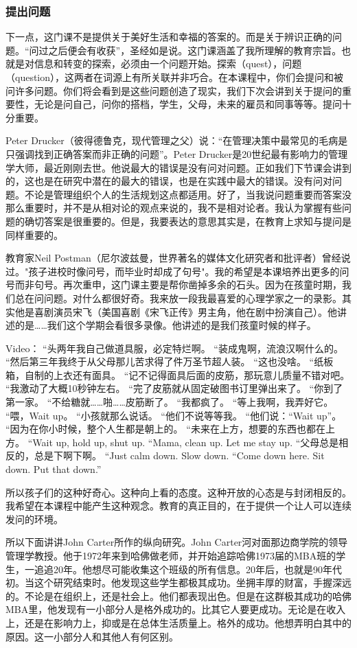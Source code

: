 \subsubsection{提出问题}
下一点，这门课不是提供关于美好生活和幸福的答案的。而是关于辨识正确的问题。“问过之后便会有收获”，圣经如是说。这门课涵盖了我所理解的教育宗旨。也就是对信息和转变的探索，必须由一个问题开始。探索（quest），问题（question），这两者在词源上有所关联并非巧合。在本课程中，你们会提问和被问许多问题。你们将会看到是这些问题创造了现实，我们下次会讲到关于提问的重要性，无论是问自己，问你的搭档，学生，父母，未来的雇员和同事等等。提问十分重要。

Peter Drucker（彼得德鲁克，现代管理之父）说：“在管理决策中最常见的毛病是只强调找到正确答案而非正确的问题”。Peter Drucker是20世纪最有影响力的管理学大师，最近刚刚去世。他说最大的错误是没有问对问题。正如我们下节课会讲到的，这也是在研究中潜在的最大的错误，也是在实践中最大的错误。没有问对问题。不论是管理组织个人的生活规划这点都适用。好了，当我说问题重要而答案没那么重要时，并不是从相对论的观点来说的，我不是相对论者。我认为掌握有些问题的确切答案是很重要的。但是，我要表达的意思其实是，在教育上求知与提问是同样重要的。

教育家Neil Postman（尼尔波兹曼，世界著名的媒体文化研究者和批评者）曾经说过。"孩子进校时像问号，而毕业时却成了句号"。我的希望是本课培养出更多的问号而非句号。再次重申，这门课主要是帮你凿掉多余的石头。因为在孩童时期，我们总在问问题。对什么都很好奇。我来放一段我最喜爱的心理学家之一的录影。其实他是喜剧演员宋飞（美国喜剧《宋飞正传》男主角，他在剧中扮演自己）。他讲述的是……我们这个学期会看很多录像。他讲述的是我们孩童时候的样子。

Video：
“头两年我自己做道具服，必定特烂啊。
“装成鬼啊，流浪汉啊什么的。
“然后第三年我终于从父母那儿苦求得了件万圣节超人装。
“这也没啥。
“纸板箱，自制的上衣还有面具。
“记不记得面具后面的皮筋，那玩意儿质量不错对吧。
“我激动了大概10秒钟左右。
“完了皮筋就从固定破图书订里弹出来了。
“你到了第一家。
“不给糖就……啪……皮筋断了。
“我都疯了。
“等上我啊，我弄好它。
“喂，Wait up。
“小孩就那么说话。
“他们不说等等我。
“他们说：“Wait up”。
“因为在你小时候，整个人生都是朝上的。
“未来在上方，想要的东西也都在上方。
“Wait up, hold up, shut up.
“Mama, clean up. Let me stay up.
“父母总是相反的，总是下啊下啊。
“Just calm down. Slow down.
“Come down here. Sit down. Put that down.”

所以孩子们的这种好奇心。这种向上看的态度。这种开放的心态是与封闭相反的。我希望在本课程中能产生这种观念。教育的真正目的，在于提供一个让人可以连续发问的环境。

所以下面讲讲John Carter所作的纵向研究。John Carter河对面那边商学院的领导管理学教授。他于1972年来到哈佛做老师，并开始追踪哈佛1973届的MBA班的学生，一追追20年。他想尽可能收集这个班级的所有信息。20年后，也就是90年代初。当这个研究结束时。他发现这些学生都极其成功。坐拥丰厚的财富，手握深远的。不论是在组织上，还是社会上。他们都表现出色。但是在这群极其成功的哈佛MBA里，他发现有一小部分人是格外成功的。比其它人要更成功。无论是在收入上，还是在影响力上，抑或是在总体生活质量上。格外的成功。他想弄明白其中的原因。这一小部分人和其他人有何区别。 

